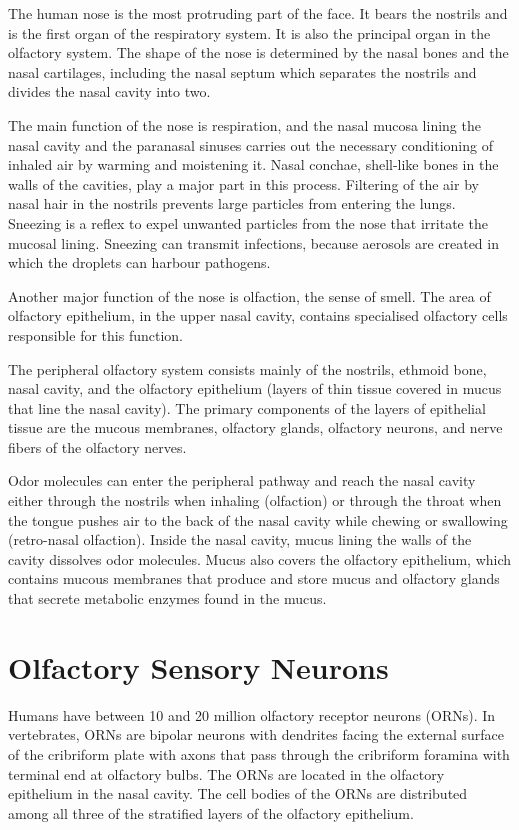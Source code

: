\documentclass[]{book}
\begin{document}
The human nose is the most protruding part of the face. It bears the nostrils and is the first organ of the respiratory system. It is also the principal organ in the olfactory system. The shape of the nose is determined by the nasal bones and the nasal cartilages, including the nasal septum which separates the nostrils and divides the nasal cavity into two.

The main function of the nose is respiration, and the nasal mucosa lining the nasal cavity and the paranasal sinuses carries out the necessary conditioning of inhaled air by warming and moistening it. Nasal conchae, shell-like bones in the walls of the cavities, play a major part in this process. Filtering of the air by nasal hair in the nostrils prevents large particles from entering the lungs. Sneezing is a reflex to expel unwanted particles from the nose that irritate the mucosal lining. Sneezing can transmit infections, because aerosols are created in which the droplets can harbour pathogens.

Another major function of the nose is olfaction, the sense of smell. The area of olfactory epithelium, in the upper nasal cavity, contains specialised olfactory cells responsible for this function.

The peripheral olfactory system consists mainly of the nostrils, ethmoid bone, nasal cavity, and the olfactory epithelium (layers of thin tissue covered in mucus that line the nasal cavity). The primary components of the layers of epithelial tissue are the mucous membranes, olfactory glands, olfactory neurons, and nerve fibers of the olfactory nerves.

Odor molecules can enter the peripheral pathway and reach the nasal cavity either through the nostrils when inhaling (olfaction) or through the throat when the tongue pushes air to the back of the nasal cavity while chewing or swallowing (retro-nasal olfaction). Inside the nasal cavity, mucus lining the walls of the cavity dissolves odor molecules. Mucus also covers the olfactory epithelium, which contains mucous membranes that produce and store mucus and olfactory glands that secrete metabolic enzymes found in the mucus.

\hypertarget{olfactory-sensory-neurons}{%
\section{Olfactory Sensory Neurons}\label{olfactory-sensory-neurons}}

Humans have between 10 and 20 million olfactory receptor neurons (ORNs). In vertebrates, ORNs are bipolar neurons with dendrites facing the external surface of the cribriform plate with axons that pass through the cribriform foramina with terminal end at olfactory bulbs. The ORNs are located in the olfactory epithelium in the nasal cavity. The cell bodies of the ORNs are distributed among all three of the stratified layers of the olfactory epithelium.
\end{document}
